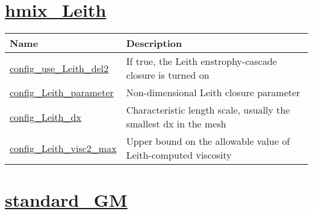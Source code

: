 \section[hmix\_Leith]{\hyperref[sec:nm_sec_hmix_Leith]{hmix\_Leith}}
\label{sec:nm_tab_hmix_Leith}

{\small
\begin{center}
\begin{longtable}{| p{2.0in} || p{4.0in} |}
	\hline
	{\bf Name} & {\bf Description} \\
	\hline
	\hline
	\hyperref[subsec:nm_sec_config_use_Leith_del2]{config\_use\_Leith\_del2} & If true, the Leith enstrophy-cascade closure is turned on \\
	\hline
	\hyperref[subsec:nm_sec_config_Leith_parameter]{config\_Leith\_parameter} & Non-dimensional Leith closure parameter \\
	\hline
	\hyperref[subsec:nm_sec_config_Leith_dx]{config\_Leith\_dx} & Characteristic length scale, usually the smallest dx in the mesh \\
	\hline
	\hyperref[subsec:nm_sec_config_Leith_visc2_max]{config\_Leith\_visc2\_max} & Upper bound on the allowable value of Leith-computed viscosity \\
	\hline
\end{longtable}
\end{center}
}
\section[standard\_GM]{\hyperref[sec:nm_sec_standard_GM]{standard\_GM}}
\label{sec:nm_tab_standard_GM}

{\small
\begin{center}
\end{center}
}
